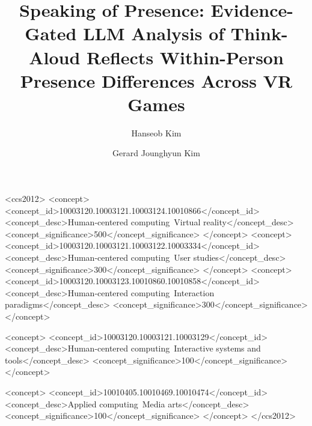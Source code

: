 \documentclass[manuscript,review,anonymous]{acmart}
\begin{document}
\title[Speaking of Presence]{Speaking of Presence: Evidence-Gated LLM Analysis of Think-Aloud Reflects Within-Person Presence Differences Across VR Games}




\author{Hanseob Kim}

\author{Gerard Jounghyun Kim}

\renewcommand{\shortauthors}{xx et al.}



\begin{CCSXML}
<ccs2012>
 <concept>
  <concept_id>10003120.10003121.10003124.10010866</concept_id>
  <concept_desc>Human-centered computing~Virtual reality</concept_desc>
  <concept_significance>500</concept_significance>
 </concept>
 <concept>
  <concept_id>10003120.10003121.10003122.10003334</concept_id>
  <concept_desc>Human-centered computing~User studies</concept_desc>
  <concept_significance>300</concept_significance>
 </concept>
  <concept>
  <concept_id>10003120.10003123.10010860.10010858</concept_id>
  <concept_desc>Human-centered computing~Interaction paradigms</concept_desc>
  <concept_significance>300</concept_significance>
 </concept>
 
 <concept>
  <concept_id>10003120.10003121.10003129</concept_id>
  <concept_desc>Human-centered computing~Interactive systems and tools</concept_desc>
  <concept_significance>100</concept_significance>
 </concept>
 
 <concept>
  <concept_id>10010405.10010469.10010474</concept_id>
  <concept_desc>Applied computing~Media arts</concept_desc>
  <concept_significance>100</concept_significance>
 </concept>
</ccs2012>
\end{CCSXML}


\end{document}
